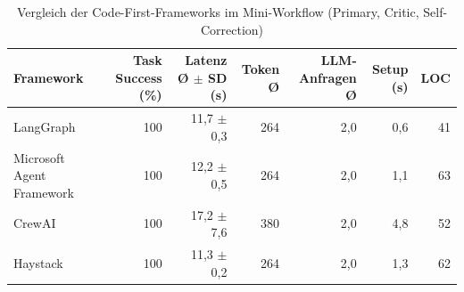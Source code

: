 \begin{table}[htbp]
\centering
\small
\caption{Vergleich der Code-First-Frameworks im Mini-Workflow (Primary, Critic, Self-Correction)}
\label{tab:ts12-frameworks}
\begin{tabular}{lrrrrrr}
\toprule
\textbf{Framework} & \textbf{Task Success (\%)} & \textbf{Latenz Ø $\pm$ SD (s)} & \textbf{Token Ø} & \textbf{LLM-Anfragen Ø} & \textbf{Setup (s)} & \textbf{LOC} \\
\midrule
LangGraph & 100 & 11,7 $\pm$ 0,3 & 264 & 2,0 & 0,6 & 41 \\
Microsoft Agent Framework & 100 & 12,2 $\pm$ 0,5 & 264 & 2,0 & 1,1 & 63 \\
CrewAI & 100 & 17,2 $\pm$ 7,6 & 380 & 2,0 & 4,8 & 52 \\
Haystack & 100 & 11,3 $\pm$ 0,2 & 264 & 2,0 & 1,3 & 62 \\
\bottomrule
\end{tabular}
\end{table}
